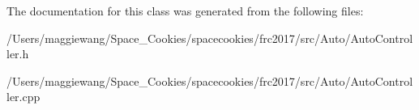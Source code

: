 The documentation for this class was generated from the following files\+:\begin{DoxyCompactItemize}
\item 
/\+Users/maggiewang/\+Space\+\_\+\+Cookies/spacecookies/frc2017/src/\+Auto/Auto\+Controller.\+h\item 
/\+Users/maggiewang/\+Space\+\_\+\+Cookies/spacecookies/frc2017/src/\+Auto/Auto\+Controller.\+cpp\end{DoxyCompactItemize}
